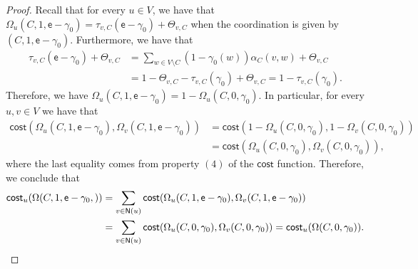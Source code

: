 \documentclass[letterpaper,11pt]{article}
\newcommand{\nsf}{\mathsf{N}}
\newcommand{\cost}{\mathsf{cost}}
\begin{document}
\begin{proof}
Recall that for every $u\in V$, we have that $\Omega_u(C,1,\mathsf{e}-\gamma_0)=\tau_{v,C}(\mathsf{e}-\gamma_0)+\Theta_{v,C}$ when the coordination is given by $(C,1,\mathsf{e}-\gamma_0)$.
Furthermore, we have that 
\begin{align*}
\tau_{v,C}(\mathsf{e}-\gamma_0)+\Theta_{v,C}&=\sum_{w\in V\setminus C}(1-\gamma_0(w))\alpha_C(v,w) +\Theta_{v,C}\\
&=1-\Theta_{v,C}-\tau_{v,C}(\gamma_0)+\Theta_{v,C}=1-\tau_{v,C}(\gamma_0).
\end{align*}
Therefore, we have $\Omega_u(C,1,\mathsf{e}-\gamma_0)=1-\Omega_u(C,0,\gamma_0)$.
In particular, for every $u,v\in V$ we have that 
\begin{align*}
\cost(\Omega_u(C,1,\mathsf{e}-\gamma_0),\Omega_v(C,1,\mathsf{e}-\gamma_0))&=\cost(1-\Omega_u(C,0,\gamma_0),1-\Omega_v(C,0,\gamma_0))\\
&=\cost(\Omega_u(C,0,\gamma_0),\Omega_v(C,0,\gamma_0)),
\end{align*}
where the last equality comes from property $(4)$ of the $\cost$ function.
Therefore, we conclude that 
\begin{align*}
\cost_u(\Omega(C,1,\mathsf{e}-\gamma_0,))&=\sum_{v\in \nsf(u)}\cost(\Omega_u(C,1,\mathsf{e}-\gamma_0),\Omega_v(C,1,\mathsf{e}-\gamma_0))\\
&=\sum_{v\in \nsf(u)}\cost(\Omega_u(C,0,\gamma_0),\Omega_v(C,0,\gamma_0))=\cost_u(\Omega(C,0,\gamma_0)).\qedhere
\end{align*}
\end{proof}
\end{document}
